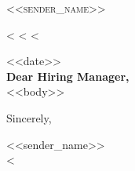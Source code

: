 \documentclass[12pt]{letter}
\begin{document}
\AddToShipoutPictureBG{%
  \color{gr}
  \AtPageUpperLeft{\rule[-1.3in]{\paperwidth}{1.3in}}
}

\begin{center}
  {\fontsize{28}{0}\selectfont\scshape <<sender_name>>}

  <%
  <%
  <%
\end{center}

\vspace{0.2in}

<<date>>\\

\vspace{-0.1in}\textbf{Dear Hiring Manager,}\\

\vspace{-0.1in}\setlength\parindent{24pt}
\noindent
<<body>>

\vspace{0.1in}
\vfill

\begin{flushright}
Sincerely,

\vspace{-0.1in}
{\LARGE\calligra <<sender_name>>}\\[1ex]
<%
\end{flushright}
\end{document}
